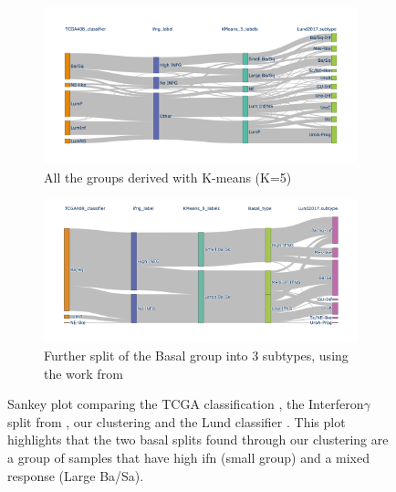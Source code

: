 \begin{figure}[!t]
    \centering
    \begin{subfigure}[!t]{0.79\textwidth}
    \includegraphics[width=1.0\textwidth,keepaspectratio]{Sections/ClusteringAnalysis/Resources/discussion/inf_comp.png}
        \caption{All the groups derived with K-means (K=5)}
        \label{fig:cs:ifn_all}
    \end{subfigure}
    \centering
    \begin{subfigure}[!t]{0.79\textwidth}
        \includegraphics[width=\textwidth,keepaspectratio]{Sections/ClusteringAnalysis/Resources/discussion/inf_3_basal.png}
        \caption{Further split of the Basal group into 3 subtypes, using the work from \citet{Baker2022-bj}}
        \label{fig:cs:ifn_three_basal}
    \end{subfigure} 
    \centering
    \centering
    \caption{Sankey plot comparing the TCGA classification \citet{Robertson2017-mg}, the Interferon$\gamma$ split from \cite{Baker2022-bj}, our clustering and the Lund classifier \citet{Marzouka2018-ge}. This plot highlights that the two basal splits found through our clustering are a group of samples that have high \acrshort{ifn} (small group) and a mixed response (Large Ba/Sa). }
    \label{fig:cs:ifn_comp}
\end{figure}

